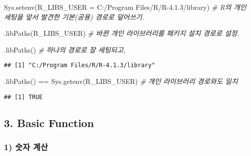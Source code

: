 \documentclass[
  12,
]{article}
\newenvironment{Shaded}{\begin{snugshade}}{\end{snugshade}}
\newcommand{\CommentTok}[1]{\textcolor[rgb]{0.56,0.35,0.01}{\textit{#1}}}
\newcommand{\FunctionTok}[1]{\textcolor[rgb]{0.00,0.00,0.00}{#1}}
\newcommand{\NormalTok}[1]{#1}
\newcommand{\OtherTok}[1]{\textcolor[rgb]{0.56,0.35,0.01}{#1}}
\newcommand{\SpecialCharTok}[1]{\textcolor[rgb]{0.00,0.00,0.00}{#1}}
\newcommand{\StringTok}[1]{\textcolor[rgb]{0.31,0.60,0.02}{#1}}
\begin{document}
\begin{Shaded}
\begin{Highlighting}[]
\FunctionTok{Sys.setenv}\NormalTok{(}\StringTok{\textquotesingle{}R\_LIBS\_USER\textquotesingle{}} \OtherTok{=} \StringTok{\textquotesingle{}C:/Program Files/R/R{-}4.1.3/library\textquotesingle{}}\NormalTok{) }\CommentTok{\# R의 \textquotesingle{}개인\textquotesingle{} 세팅을 앞서 발견한 \textquotesingle{}기본(공용)\textquotesingle{} 경로로 덮어쓰기.}

\FunctionTok{.libPaths}\NormalTok{(}\StringTok{\textquotesingle{}R\_LIBS\_USER\textquotesingle{}}\NormalTok{) }\CommentTok{\# 바뀐 \textquotesingle{}개인 라이브러리\textquotesingle{}를 패키지 설치 경로로 설정.}
\end{Highlighting}
\end{Shaded}

\begin{Shaded}
\begin{Highlighting}[]
\FunctionTok{.libPaths}\NormalTok{() }\CommentTok{\# 하나의 경로로 잘 세팅되고,}
\end{Highlighting}
\end{Shaded}

\begin{verbatim}
## [1] "C:/Program Files/R/R-4.1.3/library"
\end{verbatim}

\begin{Shaded}
\begin{Highlighting}[]
\FunctionTok{.libPaths}\NormalTok{() }\SpecialCharTok{==} \FunctionTok{Sys.getenv}\NormalTok{(}\StringTok{\textquotesingle{}R\_LIBS\_USER\textquotesingle{}}\NormalTok{) }\CommentTok{\# 개인 라이브러리 경로와도 일치}
\end{Highlighting}
\end{Shaded}

\begin{verbatim}
## [1] TRUE
\end{verbatim}

\hypertarget{basic-function}{%
\subsection{3. Basic Function}\label{basic-function}}

\hypertarget{uxc22buxc790-uxacc4uxc0b0}{%
\subsubsection{1) 숫자 계산}\label{uxc22buxc790-uxacc4uxc0b0}}
\end{document}
